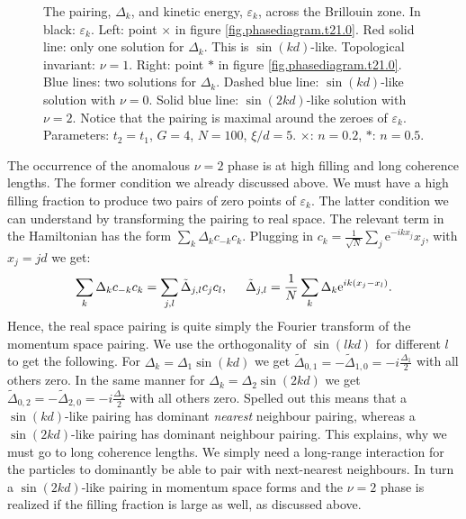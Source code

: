 \begin{figure}
\begin{center}

\caption{The pairing, $\Delta_k$, and kinetic energy, $\varepsilon_k$, across the Brillouin zone. In black: $\varepsilon_k$. Left: point $\times$ in figure \ref{fig.phasediagram.t21.0}. Red solid line: only one solution for $\Delta_k$. This is $\sin(kd)$-like. Topological invariant: $\nu = 1$. Right: point $*$ in figure \ref{fig.phasediagram.t21.0}. Blue lines: two solutions for $\Delta_k$. Dashed blue line: $\sin(kd)$-like solution with $\nu = 0$. Solid blue line: $\sin(2kd)$-like solution with $\nu = 2$. Notice that the pairing is maximal around the zeroes of $\varepsilon_k$. Parameters: $t_2 = t_1$, $G = 4$, $N = 100$, $\xi / d = 5$. $\times$: $n = 0.2$, $*$: $n = 0.5$.}
\label{fig.Deltaexamples.t21.0}
\end{center}
\end{figure}

The occurrence of the anomalous $\nu = 2$ phase is at high filling and long coherence lengths. The former condition we already discussed above. We must have a high filling fraction to produce two pairs of zero points of $\varepsilon_k$. The latter condition we can understand by transforming the pairing to real space. The relevant term in the Hamiltonian has the form $\sum_k \Delta_k c_{-k}c_{k}$. Plugging in $c_k = \frac{1}{\sqrt{N}}\sum_j \text{e}^{-ikx_j}x_j$, with $x_j = jd$ we get:
\begin{equation}
\sum_k \Delta_k c_{-k}c_{k} = \sum_{j,l} \tilde{\Delta}_{j,l}c_jc_l, \hspace{0.5cm} \tilde{\Delta}_{j,l} = \frac{1}{N}\sum_k\Delta_k\text{e}^{ik(x_j-x_l)}. \nonumber
\end{equation}
Hence, the real space pairing is quite simply the Fourier transform of the momentum space pairing. We use the orthogonality of $\sin(lkd)$ for different $l$ to get the following. For $\Delta_k = \Delta_1\sin(kd)$ we get $\tilde{\Delta}_{0,1} = -\tilde{\Delta}_{1,0} = -i\frac{\Delta_1}{2}$ with all others zero. In the same manner for $\Delta_k = \Delta_2\sin(2kd)$ we get $\tilde{\Delta}_{0,2} = -\tilde{\Delta}_{2,0} = -i\frac{\Delta_2}{2}$ with all others zero. Spelled out this means that a $\sin(kd)$-like pairing has dominant \textit{nearest} neighbour pairing, whereas a $\sin(2kd)$-like pairing has dominant  neighbour pairing. This explains, why we must go to long coherence lengths. We simply need a long-range interaction for the particles to dominantly be able to pair with next-nearest neighbours. In turn a $\sin(2kd)$-like pairing in momentum space forms and the $\nu = 2$ phase is realized if the filling fraction is large as well, as discussed above. 

